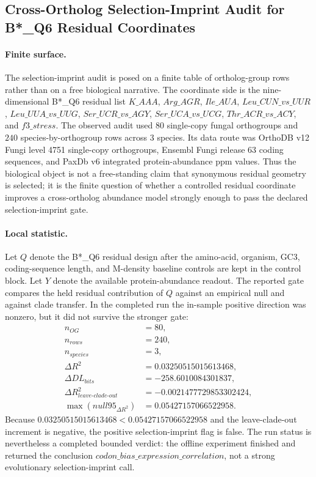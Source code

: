 \subsection{Cross-Ortholog Selection-Imprint Audit for B*\_Q6 Residual Coordinates}\label{sec:bioreality-q6-cross-ortholog-selection-imprint}

\paragraph{Finite surface.}
The selection-imprint audit is posed on a finite table of ortholog-group rows rather than on a free biological narrative.  The coordinate side is the nine-dimensional B*\_Q6 residual list
$K\_AAA$, $Arg\_AGR$, $Ile\_AUA$, $Leu\_CUN\_vs\_UUR$, $Leu\_UUA\_vs\_UUG$, $Ser\_UCR\_vs\_AGY$, $Ser\_UCA\_vs\_UCG$, $Thr\_ACR\_vs\_ACY$, and $f3\_stress$.  The observed audit used $80$ single-copy fungal orthogroups and $240$ species-by-orthogroup rows across $3$ species.  Its data route was OrthoDB v12 Fungi level 4751 single-copy orthogroups, Ensembl Fungi release 63 coding sequences, and PaxDb v6 integrated protein-abundance ppm values.  Thus the biological object is not a free-standing claim that synonymous residual geometry is selected; it is the finite question of whether a controlled residual coordinate improves a cross-ortholog abundance model strongly enough to pass the declared selection-imprint gate.

\paragraph{Local statistic.}
Let $Q$ denote the B*\_Q6 residual design after the amino-acid, organism, GC3, coding-sequence length, and M-density baseline controls are kept in the control block.  Let $Y$ denote the available protein-abundance readout.  The reported gate compares the held residual contribution of $Q$ against an empirical null and against clade transfer.  In the completed run the in-sample positive direction was nonzero, but it did not survive the stronger gate:
$$
\begin{aligned}
 n_{OG} &= 80,\\
 n_{rows} &= 240,\\
 n_{species} &= 3,\\
 \Delta R^2 &= 0.03250515015613468,\\
 \Delta DL_{bits} &= -258.6010084301837,\\
 \Delta R^2_{leave\text{-}clade\text{-}out} &= -0.0021477729853302424,\\
 \max(null95_{\Delta R^2}) &= 0.05427157066522958.
\end{aligned}
$$
Because $0.03250515015613468 < 0.05427157066522958$ and the leave-clade-out increment is negative, the positive selection-imprint flag is false.  The run status is nevertheless a completed bounded verdict: the offline experiment finished and returned the conclusion $codon\_bias\_expression\_correlation$, not a strong evolutionary selection-imprint call.

